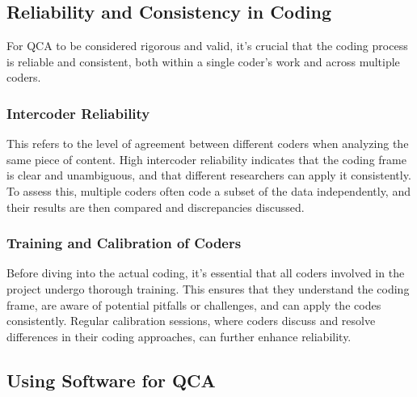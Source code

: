 \documentclass[
  b5paper]{book}
\begin{document}
\hypertarget{reliability-and-consistency-in-coding}{%
\subsection*{Reliability and Consistency in Coding}\label{reliability-and-consistency-in-coding}}

For QCA to be considered rigorous and valid, it's crucial that the coding process is reliable and consistent, both within a single coder's work and across multiple coders.

\hypertarget{intercoder-reliability}{%
\subsubsection*{Intercoder Reliability}\label{intercoder-reliability}}

This refers to the level of agreement between different coders when analyzing the same piece of content. High intercoder reliability indicates that the coding frame is clear and unambiguous, and that different researchers can apply it consistently. To assess this, multiple coders often code a subset of the data independently, and their results are then compared and discrepancies discussed.

\hypertarget{training-and-calibration-of-coders}{%
\subsubsection*{Training and Calibration of Coders}\label{training-and-calibration-of-coders}}

Before diving into the actual coding, it's essential that all coders involved in the project undergo thorough training. This ensures that they understand the coding frame, are aware of potential pitfalls or challenges, and can apply the codes consistently. Regular calibration sessions, where coders discuss and resolve differences in their coding approaches, can further enhance reliability.

\hypertarget{using-software-for-qca}{%
\subsection*{Using Software for QCA}\label{using-software-for-qca}}
\end{document}
